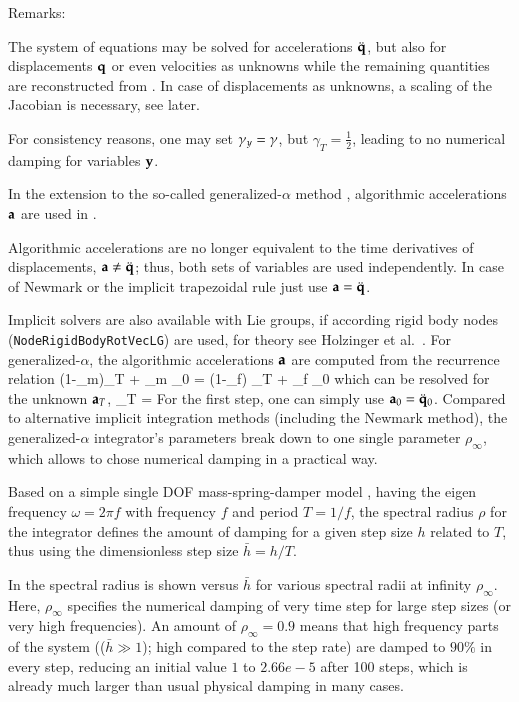 \noindent Remarks:
\bi
  \item The system of equations may be solved for accelerations $\ddot {\mathbf{q}}$, but also for displacements $\mathbf{q}$ or even velocities as unknowns while the remaining quantities are reconstructed from . In case of displacements as unknowns, a scaling of the Jacobian is necessary, see later.
  \item For consistency reasons, one may set $\gamma_y = \gamma$, but  $\gamma_T = \frac 1 2$, leading to no numerical damping for  variables $\mathbf{y}$.
  \item In the extension to the so-called generalized-$\alpha$ method \cite{Chung1993}, algorithmic accelerations $\mathbf{a}$ are used in . 
  \item Algorithmic accelerations are no longer equivalent to the time derivatives of displacements, $\mathbf{a} \neq \ddot {\mathbf{q}}$; thus, both sets of variables are used independently. In case of Newmark or the implicit trapezoidal rule just use $\mathbf{a} = \ddot {\mathbf{q}}$.
  \item Implicit solvers are also available with Lie groups, if according rigid body nodes (\texttt{NodeRigidBodyRotVecLG}) are used, for theory see Holzinger et al.\ \cite{HolzingerArnoldGerst2023}.
\ei
%
For generalized-$\alpha$, the algorithmic accelerations $\mathbf{a}$ are computed from the recurrence relation
\be
   (1-\alpha_m)\av_T + \alpha_m \av_0 = (1-\alpha_f) \ddot \uv_T + \alpha_f \ddot \uv_0
\ee
which can be resolved for the unknown $\mathbf{a}_T$,
\be
  \av_T = 
\ee
For the first step, one can simply use $\mathbf{a}_0 = \ddot {\mathbf{q}}_0$.
%
Compared to alternative implicit integration methods (including the Newmark method), the generalized-$\alpha$ integrator's parameters break down to one single parameter $\rho_\infty$, which allows to chose numerical damping in a practical way.

Based on a simple single DOF mass-spring-damper model \cite{Bauchau2011}, having the eigen frequency $\omega = 2\pi f$ with frequency $f$ and period $T=1/f$, the spectral radius $\rho$ for the integrator defines the amount of damping for a given step size $h$ related to $T$, thus using the dimensionless step size $\bar h=h/T$.

In  the spectral radius is shown versus $\bar h$ for various spectral radii at infinity $\rho_\infty$. 
Here, $\rho_\infty$ specifies the numerical damping of very time step for large step sizes (or very high frequencies). An amount of $\rho_\infty=0.9$ means that high frequency parts of the system (($\bar h \gg 1$); high compared to the step rate) are damped to $90\%$ in every step, reducing an initial value $1$ to $2.66e-5$ after 100 steps, which is already much larger than usual physical damping in many cases.

